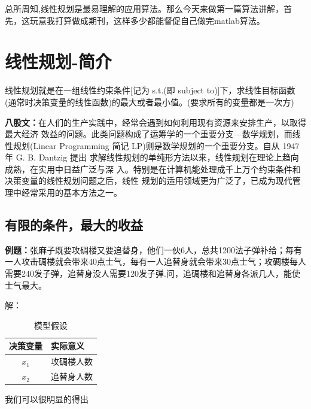 \documentclass[a4paper,20pt]{article}
\title{}
\author{}
\date{}
\begin{document}
\renewcommand{\lstlistlistingname}{代码汇总}
\renewcommand{\lstlistingname}{代码}
\renewcommand\tablename{表}
总所周知,线性规划是最易理解的应用算法。那么今天来做第一篇算法讲解，首先，这玩意我打算做成期刊，这样多少都能督促自己做完matlab算法。
\section{线性规划-简介}
线性规划就是在一组线性约束条件[记为 s.t.(即 subject to)]下，求线性目标函数(通常时决策变量的线性函数)的最大或者最小值。(要求所有的变量都是一次方)
\par \textbf{八股文：}在人们的生产实践中，经常会遇到如何利用现有资源来安排生产，以取得最大经济
效益的问题。此类问题构成了运筹学的一个重要分支—数学规划，而线性规划(Linear
Programming 简记 LP)则是数学规划的一个重要分支。自从 1947 年 G. B. Dantzig 提出
求解线性规划的单纯形方法以来，线性规划在理论上趋向成熟，在实用中日益广泛与深
入。特别是在计算机能处理成千上万个约束条件和决策变量的线性规划问题之后，线性
规划的适用领域更为广泛了，已成为现代管理中经常采用的基本方法之一。
\subsection{有限的条件，最大的收益}
\par \textbf{例题：}张麻子既要攻碉楼又要追替身，他们一伙6人，总共1200法子弹补给；每有一人攻击碉楼就会带来40点士气，每有一人追替身就会带来30点士气；攻碉楼每人需要240发子弹，追替身没人需要120发子弹.问，追碉楼和追替身各派几人，能使士气最大。

\par \small{解：}
\begin{table}[h]

    \caption{模型假设}
    \centering
    \begin{tabular}{ c l }
        \hline
        决策变量 & 实际意义   \\
        \hline
        $x_1$    & 攻碉楼人数 \\
        \hline
        $x_2$    & 追替身人数 \\
        \hline
    \end{tabular}
\end{table}
\par 我们可以很明显的得出
\end{document}

